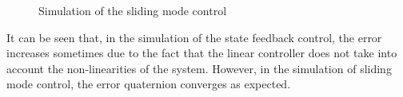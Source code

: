 \begin{table}[H]
\begin{minipage}[b]{0.49\linewidth}
\begin{figure}[H]
		\caption{Simulation of the sliding mode control}
		\label{fig:simul_sliding}
	\end{figure}
\end{minipage}
\end{table}
It can be seen that, in the simulation of the state feedback control, the error increases sometimes due to the fact that the linear controller does not take into account the non-linearities of the system. However, in the simulation of sliding mode control, the error quaternion converges as expected.
